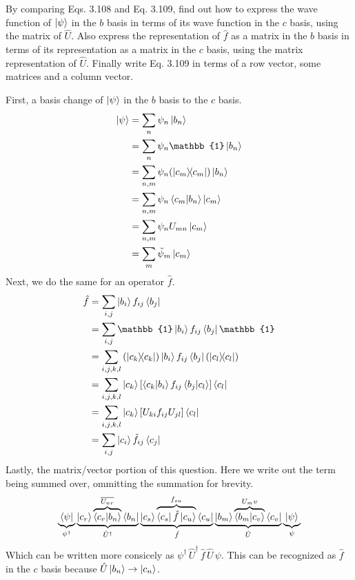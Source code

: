 \documentclass[boxes,pages]{homework}
\makeatletter
\newcommand{\conj}[1]{\overline{#1}}
\newcommand{\herm}[1]{{{#1}^\dagger}}
\numberwithin{@problem}{section}
\makeatother
\begin{document}
\begin{problem}
By comparing Eqs. 3.108 and Eq. 3.109, find out how to express the wave function of $\ket{\psi}$ in the $b$ basis in terms of its wave function in the $c$ basis, using the matrix of $\hat{U}$. Also express the representation of $\hat{f}$ as a matrix in the $b$ basis in terms of its representation as a matrix in the $c$ basis, using the matrix representation of $\hat{U}$. Finally write Eq. 3.109 in terms of a row vector, some matrices and a column vector.
\end{problem}

\begin{solution}
	First, a basis change of $\ket{\psi}$ in the $b$ basis to the $c$ basis.
	\begin{align*}
		\ket{\psi} & = \sum_n\psi_n\ket{b_n}                             \\
		           & = \sum_n\psi_n\mathbb{1}\ket{b_n}                   \\
		           & = \sum_{n, m}\psi_n\qty(\ketbra{c_m}{c_m})\ket{b_n} \\
		           & = \sum_{n, m}\psi_n\braket{c_m}{b_n}\ket{c_m}       \\
		           & = \sum_{n, m}\psi_nU_{mn}\ket{c_m}                  \\
		           & = \sum_m \tilde{\psi}_m\ket{c_m}
	\end{align*}
	Next, we do the same for an operator $\hat{f}$.
	\begin{align*}
		\hat{f} & = \sum_{i, j}\ket{b_i}f_{ij}\bra{b_j}                                                     \\
		        & = \sum_{i, j}\mathbb{1}\ket{b_i}f_{ij}\bra{b_j}\mathbb{1}                                 \\
		        & = \sum_{i, j, k, l}\qty(\ketbra{c_k}{c_k})\ket{b_i}f_{ij}\bra{b_j}\qty(\ketbra{c_l}{c_l}) \\
		        & = \sum_{i, j, k, l} \ket{c_k}\qty[\braket{c_k}{b_i}f_{ij}\braket{b_j}{c_l}]\bra{c_l}      \\
		        & = \sum_{i, j, k, l} \ket{c_k}\qty[U_{ki}f_{ij}U_{jl}]\bra{c_l}                            \\
		        & = \sum_{i,j} \ket{c_i}\tilde{f}_{ij}\bra{c_j}
	\end{align*}
	Lastly, the matrix/vector portion of this question. Here we write out the term being summed over, ommitting the summation for brevity.
	\begin{align*}
		\underbrace{\bra{\psi}}_{\herm{\psi}}\underbrace{\ket{c_r}\overbrace{\braket{c_r}{b_n}}^{\conj{U_{nr}}}\bra{b_n}}_{\herm{\hat{U}}}\underbrace{\ket{c_s}\overbrace{\bra{c_s}\hat{f}\ket{c_u}}^{f_{su}}\bra{c_u}}_{\hat{f}}\underbrace{\ket{b_m}\overbrace{\braket{b_m}{c_v}}^{U_mv}\bra{c_v}}_{\hat{U}}\underbrace{\ket{\psi}}_\psi
	\end{align*}
	Which can be written more consicely as $\herm{\psi}\,\herm{\hat{U}}\,\hat{f}\,\hat{U}\,\psi$. This can be recognized as $\hat{f}$ in the $c$ basis because $\hat{U}\ket{b_n}\to\ket{c_n}$.
\end{solution}
\end{document}
